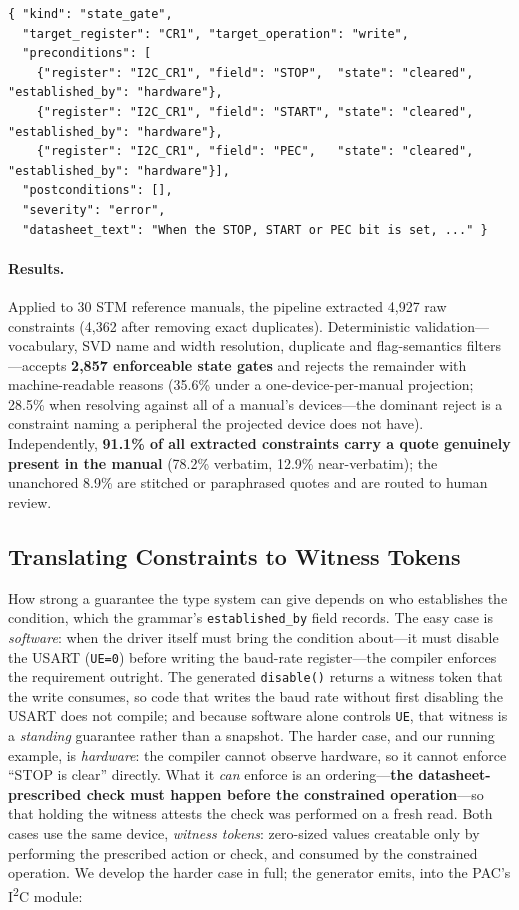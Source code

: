 \begin{lstlisting}
{ "kind": "state_gate",
  "target_register": "CR1", "target_operation": "write",
  "preconditions": [
    {"register": "I2C_CR1", "field": "STOP",  "state": "cleared", "established_by": "hardware"},
    {"register": "I2C_CR1", "field": "START", "state": "cleared", "established_by": "hardware"},
    {"register": "I2C_CR1", "field": "PEC",   "state": "cleared", "established_by": "hardware"}],
  "postconditions": [],
  "severity": "error",
  "datasheet_text": "When the STOP, START or PEC bit is set, ..." }
\end{lstlisting}

\paragraph{Results.}
Applied to 30 STM reference manuals, the pipeline extracted 4{,}927 raw
constraints (4{,}362 after removing exact duplicates). Deterministic
validation---vocabulary, SVD name and width resolution, duplicate and
flag-semantics filters---accepts \textbf{2{,}857 enforceable state gates} and
rejects the remainder with machine-readable reasons (35.6\% under a
one-device-per-manual projection; 28.5\% when resolving against all of a
manual's devices---the dominant reject is a constraint naming a peripheral
the projected device does not have). Independently, \textbf{91.1\% of all
extracted constraints carry a quote genuinely present in the manual} (78.2\%
verbatim, 12.9\% near-verbatim); the unanchored 8.9\% are stitched or
paraphrased quotes and are routed to human review.

\subsection{Translating Constraints to Witness Tokens}
\label{sec:enforcement:witnesses}

How strong a guarantee the type system can give depends on who establishes
the condition, which the grammar's \texttt{established\_by} field records.
The easy case is \emph{software}: when the driver itself must bring the
condition about---it must disable the USART (\texttt{UE=0}) before writing
the baud-rate register---the compiler enforces the requirement outright.
The generated \texttt{disable()} returns a witness token that the write
consumes, so code that writes the baud rate without first disabling the
USART does not compile; and because software alone controls \texttt{UE},
that witness is a \emph{standing} guarantee rather than a snapshot. The
harder case, and our running example, is \emph{hardware}: the compiler
cannot observe hardware, so it cannot enforce ``STOP is clear'' directly.
What it \emph{can} enforce is an ordering---\textbf{the datasheet-prescribed
check must happen before the constrained operation}---so that holding the
witness attests the check was performed on a fresh read. Both cases use the
same device, \emph{witness tokens}: zero-sized values creatable only by
performing the prescribed action or check, and consumed by the constrained
operation. We develop the harder case in full; the generator emits, into the
PAC's I\textsuperscript{2}C module:

